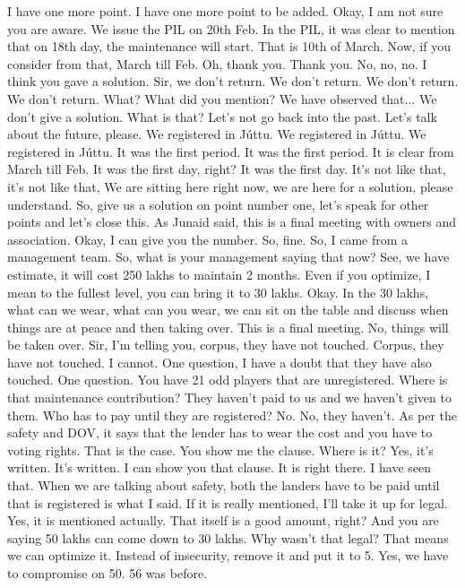 I have one more point. I have one more point to be added.
Okay, I am not sure you are aware.
We issue the PIL on 20th Feb.
In the PIL, it was clear to mention that on 18th day, the maintenance will start.
That is 10th of March.
Now, if you consider from that, March till Feb.
Oh, thank you.
Thank you.
No, no, no.
I think you gave a solution.
Sir, we don't return.
We don't return.
We don't return.
We don't return.
What?
What did you mention?
We have observed that...
We don't give a solution.
What is that?
Let's not go back into the past. Let's talk about the future, please.
We registered in Júttu.
We registered in Júttu.
We registered in Júttu.
It was the first period.
It was the first period.
It is clear from March till Feb.
It was the first day, right?
It was the first day.
It's not like that, it's not like that, 
We are sitting here right now, we are here for a solution, please understand. So, give us a solution on point number one, let's speak for other points and let's close this. As Junaid said, this is a final meeting with owners and association.
Okay, I can give you the number. So, fine.
So, I came from a management team.
So, what is your management saying that now?
See, we have estimate, it will cost 250 lakhs to maintain 2 months. Even if you optimize, I mean to the fullest level, you can bring it to 30 lakhs.
Okay. In the 30 lakhs, what can we wear, what can you wear, we can sit on the table and discuss when things are at peace and then taking over.
This is a final meeting.
No, things will be taken over.
Sir, I'm telling you, corpus, they have not touched.
Corpus, they have not touched.
I cannot.
One question, I have a doubt that they have also touched.
One question. You have 21 odd players that are unregistered. Where is that maintenance contribution?
They haven't paid to us and we haven't given to them.
Who has to pay until they are registered?
No.
No, they haven't.
As per the safety and DOV, it says that the lender has to wear the cost and you have to voting rights.
That is the case. You show me the clause. Where is it?
Yes, it's written.
It's written.
I can show you that clause.
It is right there. I have seen that.
When we are talking about safety, both the landers have to be paid until that is registered is what I said.
If it is really mentioned, I'll take it up for legal.
Yes, it is mentioned actually.
That itself is a good amount, right?
And you are saying 50 lakhs can come down to 30 lakhs. Why wasn't that legal?
That means we can optimize it.
Instead of insecurity, remove it and put it to 5.
Yes, we have to compromise on 50.
56 was before.
